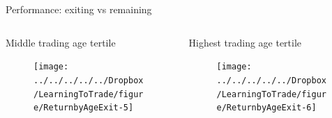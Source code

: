 \documentclass{beamer}
\begin{document}
\begin{frame}{Performance: exiting vs remaining}
\begin{columns}[t]
		\begin{column}{0.32\textwidth}
			\begin{block}{\footnotesize Middle trading age tertile}
				\begin{figure}
					\texttt{[image: ../../../../../Dropbox/LearningToTrade/figure/ReturnbyAgeExit-5]}
				\end{figure}
			\end{block}
		\end{column}

		\begin{column}{0.32\textwidth}
			\begin{block}{\footnotesize Highest trading age tertile}
				\begin{figure}
					\texttt{[image: ../../../../../Dropbox/LearningToTrade/figure/ReturnbyAgeExit-6]}
				\end{figure}
			\end{block}
		\end{column}
	\end{columns}
\end{frame}
\end{document}
